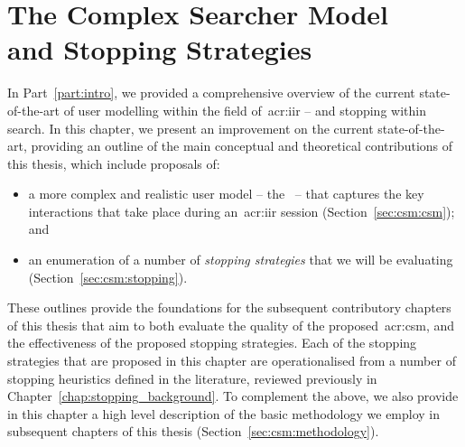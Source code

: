 
\chapter[The Complex Searcher Model and Stopping Strategies]{The Complex Searcher Model\\and Stopping Strategies}\label{chap:csm}
In Part~\ref{part:intro}, we provided a comprehensive overview of the current state-of-the-art of user modelling within the field of~\gls{acr:iir} -- and stopping within search. In this chapter, we present an improvement on the current state-of-the-art, providing an outline of the main conceptual and theoretical contributions of this thesis, which include proposals of:

\vspace*{-2mm}
\begin{itemize}
    \item[\blueboxbold{(i)}]{a more complex and realistic user model -- the~ -- that captures the key interactions that take place during an~\gls{acr:iir} session (Section~\ref{sec:csm:csm}); and}
    \item[\blueboxbold{(ii)}]{an enumeration of a number of \emph{stopping strategies} that we will be evaluating (Section~\ref{sec:csm:stopping}).}
\end{itemize}
\vspace*{-2mm}

These outlines provide the foundations for the subsequent contributory chapters of this thesis that aim to both evaluate the quality of the proposed~\gls{acr:csm}, and the effectiveness of the proposed stopping strategies. Each of the stopping strategies that are proposed in this chapter are operationalised from a number of stopping heuristics defined in the literature, reviewed previously in Chapter~\ref{chap:stopping_background}. To complement the above, we also provide in this chapter  a high level description of the basic methodology we employ in subsequent chapters of this thesis (Section~\ref{sec:csm:methodology}).

